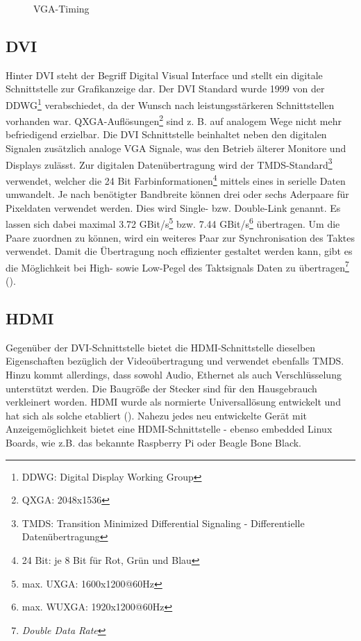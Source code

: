\begin{figure}[htp]
	\centering
{}
	\caption{VGA-Timing}
	\label{fig:vga_timing}
\end{figure}

\subsection{DVI}
Hinter DVI steht der Begriff Digital Visual Interface und stellt ein digitale Schnittstelle zur Grafikanzeige dar. Der DVI Standard wurde 1999 von der DDWG\footnote{DDWG: Digital Display Working Group} verabschiedet, da der Wunsch nach leistungsstärkeren Schnittstellen vorhanden war. QXGA-Auflösungen\footnote{QXGA: 2048x1536} sind z. B. auf analogem Wege nicht mehr befriedigend erzielbar. Die DVI Schnittstelle beinhaltet neben den digitalen Signalen zusätzlich analoge VGA Signale, was den Betrieb älterer Monitore und Displays zulässt. Zur digitalen Datenübertragung wird der TMDS-Standard\footnote{TMDS: Transition Minimized Differential Signaling - Differentielle Datenübertragung} verwendet, welcher die 24 Bit Farbinformationen\footnote{24 Bit: je 8 Bit für Rot, Grün und Blau} mittels eines  in serielle Daten umwandelt. Je nach benötigter Bandbreite können drei oder sechs Aderpaare für Pixeldaten verwendet werden. Dies wird Single- bzw. Double-Link genannt. Es lassen sich dabei maximal 3.72 GBit/s\footnote{max. UXGA: 1600x1200@60Hz} bzw. 7.44 GBit/s\footnote{max. WUXGA: 1920x1200@60Hz} übertragen. Um die Paare zuordnen zu können, wird ein weiteres Paar zur Synchronisation des Taktes verwendet. Damit die Übertragung noch effizienter gestaltet werden kann, gibt es die Möglichkeit bei High- sowie Low-Pegel des Taktsignals Daten zu übertragen\footnote{\textit{Double Data Rate}} (\cite{Leunig2002}).

\subsection{HDMI}
Gegenüber der DVI-Schnittstelle bietet die HDMI-Schnittstelle dieselben Eigenschaften bezüglich der Videoübertragung und verwendet ebenfalls TMDS. Hinzu kommt allerdings, dass sowohl Audio, Ethernet als auch Verschlüsselung unterstützt werden. Die Baugröße der Stecker sind für den Hausgebrauch verkleinert worden. HDMI wurde als normierte Universallösung entwickelt und hat sich als solche etabliert (\cite{Extron2014}). Nahezu jedes neu entwickelte Gerät mit Anzeigemöglichkeit bietet eine HDMI-Schnittstelle - ebenso embedded Linux Boards, wie z.B. das bekannte Raspberry Pi oder Beagle Bone Black.


